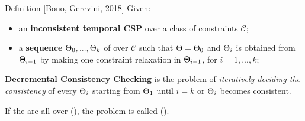 \begin{frame}{Definition [Bono, Gerevini, 2018]}
    \vspace{-8pt}
    Given:
	\begin{itemize}
		\item \small{an \textbf{inconsistent temporal CSP} \CSP{} over a class of constraints $\mathcal{C}$};
		\item \small{a \textbf{sequence} $\CSP{}_{0}, ..., \CSP{}_k$ of \TCSPNames{} over $\mathcal{C}$ such that $\CSP{}= \CSP{}_{0}$ and $\CSP{}_i$ is obtained from $\CSP{}_{i-1}$ by making one constraint relaxation in $\CSP{}_{i-1}$, for $i = 1, ..., k$};
	\end{itemize}
	\textbf{\color{blue} Decremental Consistency Checking} is the problem of \textit{iteratively deciding the consistency} of every $\CSP{}_i$ starting from $\CSP{}_1$ until $i = k$ or $\CSP{}_i$ becomes consistent.


    If the \TCSPNames{} are all over \PAName{} (\OrdHornName{}), the problem is called \DPSATProblemName{} (\DOHSATProblemName{}).
\end{frame}

